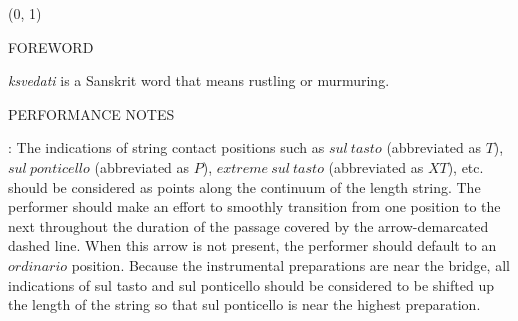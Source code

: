 \documentclass[11pt]{article}
\begin{document}
\begin{textblock}{23}(0, 1)
\begin{center}
\huge FOREWORD
\end{center}
\end{textblock}


\begingroup
\begin{center}
\textit{ksvedati} is a Sanskrit word that means rustling or murmuring.
\rightskip\leftskip
\phantom{text} \hfill

\endgroup

\vspace*{0.25\baselineskip}

\begin{center}
\huge PERFORMANCE NOTES
\end{center}
\begingroup
\begin{center}

 : The indications of string contact positions such as $sul \ tasto$ (abbreviated as $T$), $sul \ ponticello$ (abbreviated as $P$), $extreme \ sul \ tasto$ (abbreviated as $XT$), etc. should be considered as points along the continuum of the length string. The performer should make an effort to smoothly transition from one position to the next throughout the duration of the passage covered by the arrow-demarcated dashed line. When this arrow is not present, the performer should default to an $ordinario$ position. Because the instrumental preparations are near the bridge, all indications of sul tasto and sul ponticello should be considered to be shifted up the length of the string so that sul ponticello is near the highest preparation.
\rightskip\leftskip
\phantom{text} \hfill \phantom{()}



\end{center}
\end{center}
\end{document}
